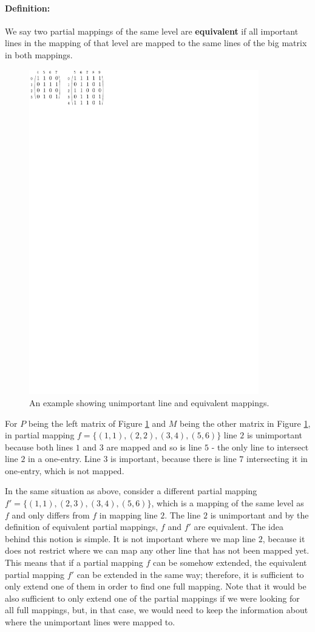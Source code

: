 \paragraph{Definition:}
We say two partial mappings of the same level are \textbf{equivalent} if all important lines in the mapping of that level are mapped to the same lines of the big matrix in both mappings.
\begin{figure}[h!]
\centering
\includegraphics[width=100mm]{../img/equivalent.pdf}
\caption{An example showing unimportant line and equivalent mappings.}
\label{equivalent}
\end{figure}
For $P$ being the left matrix of Figure \ref{equivalent} and $M$ being the other matrix in Figure \ref{equivalent}, in partial mapping $f=\{(1,1),(2,2),(3,4),(5,6)\}$ line $2$ is unimportant because both lines $1$ and $3$ are mapped and so is line $5$ - the only line to intersect line $2$ in a one-entry. Line $3$ is important, because there is line $7$ intersecting it in one-entry, which is not mapped.

In the same situation as above, consider a different partial mapping $f'=\{(1,1),(2,3),(3,4),(5,6)\}$, which is a mapping of the same level as $f$ and only differs from $f$ in mapping line $2$. The line $2$ is unimportant and by the definition of equivalent partial mappings, $f$ and $f'$ are equivalent. The idea behind this notion is simple. It is not important where we map line $2$, because it does not restrict where we can map any other line that has not been mapped yet. This means that if a partial mapping $f$ can be somehow extended, the equivalent partial mapping $f'$ can be extended in the same way; therefore, it is sufficient to only extend one of them in order to find one full mapping. Note that it would be also sufficient to only extend one of the partial mappings if we were looking for all full mappings, but, in that case, we would need to keep the information about where the unimportant lines were mapped to.